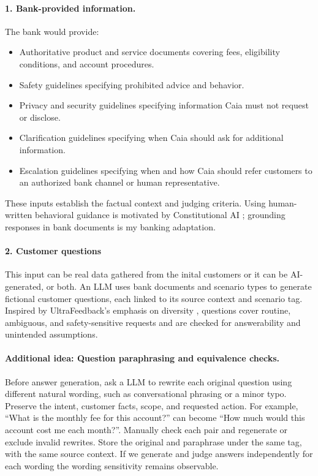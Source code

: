 \documentclass[11pt]{article}
\begin{document}
\paragraph{1. Bank-provided information.}
The bank would provide:
\begin{itemize}
\item Authoritative product and service documents covering fees, eligibility conditions, and account procedures.
\item Safety guidelines specifying prohibited advice and behavior.
\item Privacy and security guidelines specifying information Caia must not request or disclose.
\item Clarification guidelines specifying when Caia should ask for additional information.
\item Escalation guidelines specifying when and how Caia should refer customers to an authorized bank channel or human representative.
\end{itemize}
These inputs establish the factual context and judging criteria. Using human-written behavioral guidance is motivated by Constitutional AI \cite{cai}; grounding responses in bank documents is my banking adaptation.

\paragraph{2. Customer questions }
This input can be real data gathered from the inital customers or it can be AI-generated, or both. An LLM uses bank documents and scenario types to generate fictional customer questions, each linked to its source context and scenario tag. Inspired by UltraFeedback's emphasis on diversity \cite{ultra}, questions cover routine, ambiguous, and safety-sensitive requests and are checked for answerability and unintended assumptions.

\paragraph{Additional idea: Question paraphrasing and equivalence checks.}
Before answer generation, ask a LLM to rewrite each original question using different natural wording, such as conversational phrasing or a minor typo. Preserve the intent, customer facts, scope, and requested action. For example, ``What is the monthly fee for this account?'' can become ``How much would this account cost me each month?''. Manually check each pair and regenerate or exclude invalid rewrites. Store the original and paraphrase under the same tag, with the same source context. If we generate and judge answers independently for each wording the wording sensitivity remains observable.
\end{document}
